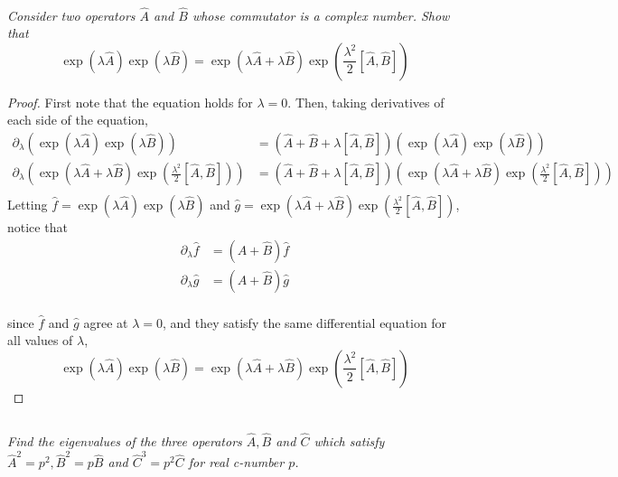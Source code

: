 \documentclass{article}
\begin{document}
\subsection{}
\textit{Consider two operators $\hat{A}$ and $\hat{B}$ whose commutator is a complex number. Show that 
$$\exp(\lambda \hat{A}) \exp(\lambda \hat{B})=\exp \left(\lambda \hat{A}+\lambda \hat{B} \right)  \exp \left(\frac{\lambda^{2}}{2}[\hat{A}, \hat{B}]\right)$$}
\begin{proof}
    First note that the equation holds for $\lambda = 0$. Then, taking derivatives of each side of the equation, 
    \begin{align*}
        \partial_\lambda\left(\exp(\lambda \hat{A}) \exp(\lambda \hat{B})\right)&=\left(\hat{A} + \hat{B} + \lambda [\hat{A}, \hat{B}]  \right)\left(\exp(\lambda \hat{A}) \exp(\lambda \hat{B})\right)\\
        \partial_\lambda\left(\exp \left(\lambda \hat{A}+\lambda \hat{B} \right)  \exp \left(\frac{\lambda^{2}}{2}[\hat{A}, \hat{B}]\right)\right) &= \left(\hat{A} + \hat{B} +\lambda[\hat{A}, \hat{B}]\right)\left(\exp \left(\lambda \hat{A}+\lambda \hat{B} \right)  \exp \left(\frac{\lambda^{2}}{2}[\hat{A}, \hat{B}]\right)\right)\\
    \end{align*}
    Letting $\hat{f} = \exp(\lambda \hat{A}) \exp(\lambda \hat{B})$ and $\hat{g} = \exp \left(\lambda \hat{A}+\lambda \hat{B} \right)  \exp \left(\frac{\lambda^{2}}{2}[\hat{A}, \hat{B}]\right)$, notice that 
    \begin{align*}
        \partial_\lambda \hat{f} &= (\hat{A} + \hat{B}) \hat{f} \\ 
        \partial_\lambda \hat{g} &= (\hat{A} + \hat{B}) \hat{g} \\ 
    \end{align*}
    
    since $\hat{f}$ and $\hat{g}$ agree at $\lambda = 0$, and they satisfy the same differential equation for all values of $\lambda$,  
    $$
        \boxed{\exp(\lambda \hat{A}) \exp(\lambda \hat{B})=\exp \left(\lambda \hat{A}+\lambda \hat{B} \right)  \exp \left(\frac{\lambda^{2}}{2}[\hat{A}, \hat{B}]\right)}
    $$
\end{proof}


\subsection{}
\textit{Find the eigenvalues of the three operators $\hat{A}, \hat{B}$ and $\hat{C}$ which satisfy $\hat{A}^{2}=p^{2}, \hat{B}^{2}=p \hat{B}$ and $\hat{C}^{3}=p^{2} \hat{C}$ for real c-number $p$.}
\end{document}
